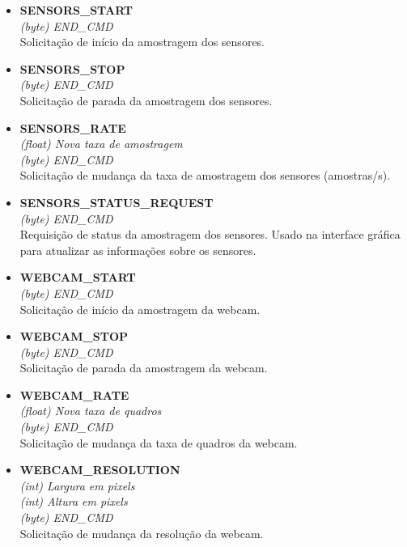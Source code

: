 \begin{itemize}
\begin{itemize}
      \item \textbf{SENSORS\_START}\\
      \textit{(byte) END\_CMD}\\
	Solicitação de início da amostragem dos sensores.

      \item \textbf{SENSORS\_STOP}\\
      \textit{(byte) END\_CMD}\\
	Solicitação de parada da amostragem dos sensores.

      \item \textbf{SENSORS\_RATE} \\
	\textit{(float) Nova taxa de amostragem}\\
	\textit{(byte) END\_CMD}\\
	Solicitação de mudança da taxa de amostragem dos sensores (amostras/s).

      \item \textbf{SENSORS\_STATUS\_REQUEST}\\
      \textit{(byte) END\_CMD}\\
	Requisição de status da amostragem dos sensores. Usado na interface gráfica para atualizar as informações sobre os sensores.

      \item \textbf{WEBCAM\_START}\\
      \textit{(byte) END\_CMD}\\
	Solicitação de início da amostragem da webcam.

      \item \textbf{WEBCAM\_STOP}\\
      \textit{(byte) END\_CMD}\\
	Solicitação de parada da amostragem da webcam.

      \item \textbf{WEBCAM\_RATE} \\
	\textit{(float) Nova taxa de quadros}\\
	\textit{(byte) END\_CMD}\\
	Solicitação de mudança da taxa de quadros da webcam.

      \item \textbf{WEBCAM\_RESOLUTION} \\
	\textit{(int) Largura em pixels }\\
	\textit{(int) Altura em pixels}\\
	\textit{(byte) END\_CMD}\\
	Solicitação de mudança da resolução da webcam.


\end{itemize}
\end{itemize}
